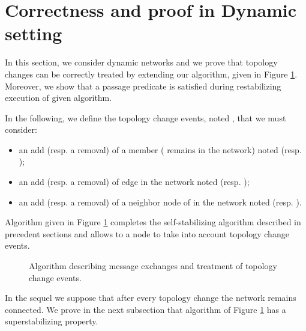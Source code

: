 \documentclass[11pt]{article}
\begin{document}
\section{Correctness and proof in Dynamic setting}



In this section, we consider dynamic networks and we prove that topology changes can be correctly treated by extending our algorithm, given in Figure \ref{fig:algo_dynamic}. Moreover, we show that a passage predicate is satisfied during restabilizing execution of given algorithm.

In the following, we define the topology change events, noted , that we must consider:
\begin{itemize}
\item an add (resp. a removal) of a member  ( remains in the network) noted  (resp. );
\item an add (resp. a removal) of edge  in the network noted  (resp. );
\item an add (resp. a removal) of a neighbor node  of  in the network noted  (resp. ).
\end{itemize}



Algorithm given in Figure \ref{fig:algo_dynamic} completes the self-stabilizing algorithm described in precedent sections and allows to a node  to take into account topology change events.
\begin{small}
\begin{figure}[!ht]
\begin{center}
\end{center}
\caption{Algorithm describing message exchanges and treatment of topology change events.}
\label{fig:algo_dynamic}
\end{figure}
\end{small}
In the sequel we suppose that after every topology change the network remains connected. We prove in the next subsection that algorithm of Figure \ref{fig:algo_dynamic} has a superstabilizing property.
\end{document}
